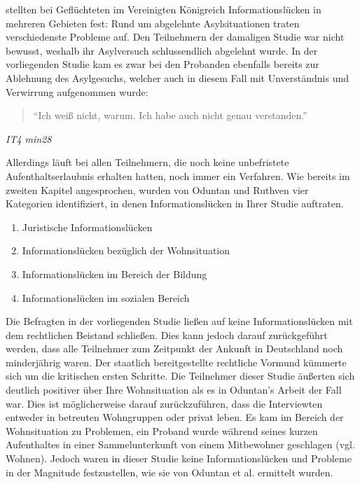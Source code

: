\citet{oduntan2017investigating} stellten bei Geflüchteten im Vereinigten Königreich Informationslücken in mehreren Gebieten fest:\newline
Rund um abgelehnte Asylsituationen traten verschiedenste Probleme auf. Den Teilnehmern der damaligen Studie war nicht bewusst, weshalb ihr Asylversuch schlussendlich abgelehnt wurde.\newline 
In der vorliegenden Studie kam es zwar bei den Probanden ebenfalls bereits zur Ablehnung des Asylgesuchs, welcher auch in diesem Fall mit Unverständnis und Verwirrung aufgenommen wurde:
\begin{quote}
    ``Ich weiß nicht, warum. Ich habe auch nicht genau verstanden.''
\end{quote}
\centerline{\textit{IT4 min28}}
Allerdings läuft bei allen Teilnehmern, die noch keine unbefristete Aufenthaltserlaubnis erhalten hatten,  noch immer ein Verfahren.\newline
Wie bereits im zweiten Kapitel angesprochen, wurden von Oduntan und Ruthven vier Kategorien identifiziert, in denen Informationslücken in Ihrer Studie auftraten.
\begin{enumerate}
    \item Juristische Informationslücken
    \item Informationslücken bezüglich der Wohnsituation
    \item Informationslücken im Bereich der Bildung
    \item Informationslücken im sozialen Bereich
\end{enumerate}
Die Befragten in der vorliegenden Studie ließen auf keine Informationslücken mit dem rechtlichen Beistand schließen. Dies kann jedoch darauf zurückgeführt werden, dass alle Teilnehmer zum Zeitpunkt der Ankunft in Deutschland noch minderjährig waren. Der staatlich bereitgestellte rechtliche Vormund kümmerte sich um die kritischen ersten Schritte.\newline
Die Teilnehmer dieser Studie äußerten sich deutlich positiver über Ihre Wohnsituation als es in Oduntan's Arbeit der Fall war. Dies ist möglicherweise darauf zurückzuführen, dass die Interviewten entweder in betreuten Wohngruppen oder privat leben. Es kam im Bereich der Wohnsituation zu Problemen, ein Proband wurde während seines kurzen Aufenthaltes in einer Sammelunterkunft von einem Mitbewohner geschlagen (vgl. Wohnen). Jedoch waren in dieser Studie keine Informationslücken und Probleme in der Magnitude festzustellen, wie sie von Oduntan et al. ermittelt wurden.\newline
